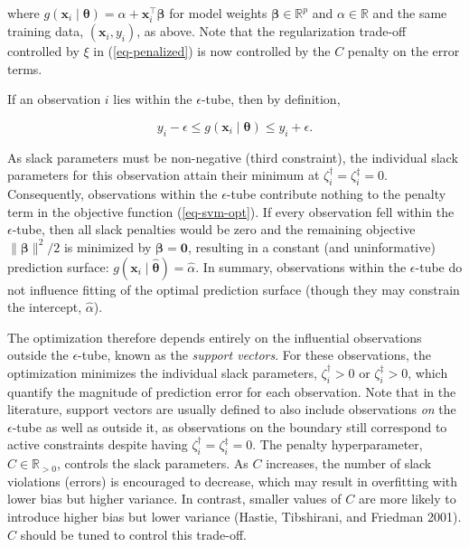 \documentclass[
  letterpaper,
  krantz2]{style/krantz}
\begin{document}
where
\(g(\mathbf{x}_i \mid \boldsymbol{\theta}) = \alpha + \mathbf{x}_i^\top\boldsymbol{\beta}\)
for model weights \(\boldsymbol{\beta}\in \mathbb{R}^p\) and
\(\alpha \in \mathbb{R}\) and the same training data,
\((\mathbf{x}_i, y_i)\), as above. Note that the regularization
trade-off controlled by \(\xi\) in (\ref{eq-penalized}) is now
controlled by the \(C\) penalty on the error terms.

If an observation \(i\) lies within the \(\epsilon\)-tube, then by
definition,

\[
y_i - \epsilon \le g(\mathbf{x}_i \mid \boldsymbol{\theta}) \le y_i + \epsilon.
\]

As slack parameters must be non-negative (third constraint), the
individual slack parameters for this observation attain their minimum at
\(\zeta_i^\dagger=\zeta_i^\ddagger=0\). Consequently, observations
within the \(\epsilon\)-tube contribute nothing to the penalty term in
the objective function (\ref{eq-svm-opt}). If every observation fell
within the \(\epsilon\)-tube, then all slack penalties would be zero and
the remaining objective \(\|\boldsymbol{\beta}\|^2/2\) is minimized by
\(\boldsymbol{\beta}= \mathbf{0}\), resulting in a constant (and
uninformative) prediction surface:
\(g(\mathbf{x}_i \mid \hat{\boldsymbol{\theta}}) = \hat{\alpha}\). In
summary, observations within the \(\epsilon\)-tube do not influence
fitting of the optimal prediction surface (though they may constrain the
intercept, \(\hat{\alpha}\)).

The optimization therefore depends entirely on the influential
observations outside the \(\epsilon\)-tube, known as the \emph{support
vectors}. For these
observations, the optimization minimizes the individual slack
parameters, \(\zeta_i^\dagger > 0\) or \(\zeta_i^\ddagger > 0\), which
quantify the magnitude of prediction error for each observation. Note
that in the literature, support vectors are usually defined to also
include observations \emph{on} the \(\epsilon\)-tube as well as outside
it, as observations on the boundary still correspond to active
constraints despite having \(\zeta_i^\dagger = \zeta_i^\ddagger = 0\).
The penalty hyperparameter, \(C \in \mathbb{R}_{>0}\), controls the
slack parameters. As \(C\) increases, the number of slack violations
(errors) is encouraged to decrease, which may result in overfitting with
lower bias but higher variance. In contrast, smaller values of \(C\) are
more likely to introduce higher bias but lower variance (Hastie,
Tibshirani, and Friedman 2001). \(C\) should be tuned to control this
trade-off.
\end{document}
